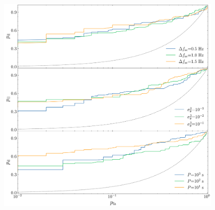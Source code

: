 \documentclass[pra,superscriptaddress,reprint,amsmath,amssymb,nofootinbib]{revtex4-2}
\providecommand{\DIFaddbeginFL}{} %
\providecommand{\DIFaddendFL}{} %
\providecommand{\DIFdelbeginFL}{} %
\providecommand{\DIFdelendFL}{} %
\newcommand{\DIFscaledelfig}{0.5}
\newlength{\DIFdelgraphicswidth} %
\newlength{\DIFdelgraphicsheight} %
\newcommand{\DIFaddincludegraphics}[2][]{{\color{blue}\fbox{\DIFOincludegraphics[#1]{#2}}}} %
\newcommand{\DIFdelincludegraphics}[2][]{%
\sbox{\DIFdelgraphicsbox}{\DIFOincludegraphics[#1]{#2}}%
\settoboxwidth{\DIFdelgraphicswidth}{\DIFdelgraphicsbox} %
\settoboxtotalheight{\DIFdelgraphicsheight}{\DIFdelgraphicsbox} %
\scalebox{\DIFscaledelfig}{%
\parbox[b]{\DIFdelgraphicswidth}{\usebox{\DIFdelgraphicsbox}\\[-\baselineskip] \rule{\DIFdelgraphicswidth}{0em}}\llap{\resizebox{\DIFdelgraphicswidth}{\DIFdelgraphicsheight}{%
\setlength{\unitlength}{\DIFdelgraphicswidth}%
\begin{picture}(1,1)%
\thicklines\linethickness{2pt} %
{\color[rgb]{1,0,0}\put(0,0){\framebox(1,1){}}}%
{\color[rgb]{1,0,0}\put(0,0){\line( 1,1){1}}}%
{\color[rgb]{1,0,0}\put(0,1){\line(1,-1){1}}}%
\end{picture}%
}\hspace*{3pt}}} %
} %
\DeclareRobustCommand{\DIFaddbeginFL}{\DIFOaddbeginFL \let\includegraphics\DIFaddincludegraphics} %
\DeclareRobustCommand{\DIFaddendFL}{\DIFOaddendFL \let\includegraphics\DIFOincludegraphics} %
\DeclareRobustCommand{\DIFdelbeginFL}{\DIFOdelbeginFL \let\includegraphics\DIFdelincludegraphics} %
\DeclareRobustCommand{\DIFdelendFL}{\DIFOaddendFL \let\includegraphics\DIFOincludegraphics} %
\begin{document}
\begin{figure}
	\begin{center}
		\DIFdelbeginFL %
\DIFdelendFL \DIFaddbeginFL \includegraphics[width=\columnwidth]{images/roc_curve_mains_power_params_log}
	\DIFaddendFL \end{center}

\end{figure}
\end{document}
